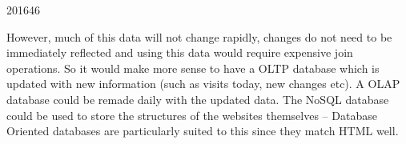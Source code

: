 \documentclass[10pt,\jkfside,a4paper]{article}
\begin{document}
\begin{examquestion}{2016}{4}{6}
\begin{enumerate}
However, much of this data will not change rapidly, changes do not need to be 
immediately reflected and using this data would require expensive join operations. 
So it would make more sense to have a OLTP database which is updated with new 
information (such as visits today, new changes etc). A OLAP database could be 
remade daily with the updated data. The NoSQL database could be used to store 
the structures of the websites themselves -- Database Oriented databases are 
particularly suited to this since they match HTML well.

\end{enumerate}

\end{examquestion}
\end{document}
